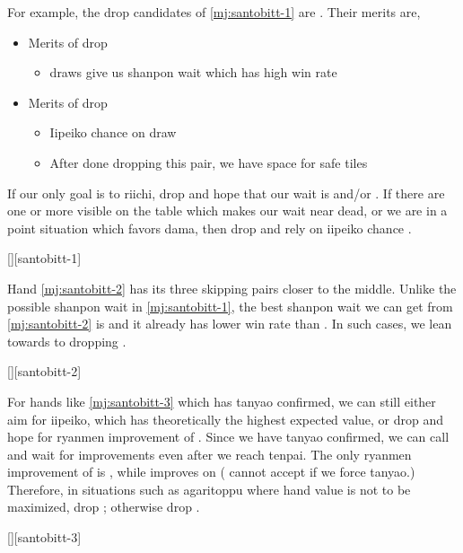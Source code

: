 \documentclass[12pt]{article}
\begin{document}
For example, the drop candidates of \ref{mj:santobitt-1} are . Their merits are,

\begin{itemize}
  \item Merits of  drop
  \begin{itemize}
    \item {} draws give us  shanpon wait which has high win rate
  \end{itemize}
  \item Merits of  drop
  \begin{itemize}
    \item Iipeiko chance on  draw
    \item After done dropping this pair, we have space for safe tiles
  \end{itemize}
\end{itemize}

If our only goal is to riichi, drop  and hope that our wait is  and/or . If there are one or more  visible on the table which makes our wait near dead, or we are in a point situation which favors dama, then drop  and rely on iipeiko chance \citep[][p.~35]{zero-teyaku}.

[][santobitt-1]

Hand \ref{mj:santobitt-2} has its three skipping pairs closer to the middle. Unlike the possible  shanpon wait in \ref{mj:santobitt-1}, the best shanpon wait we can get from \ref{mj:santobitt-2} is  and it already has lower win rate than . In such cases, we lean towards to dropping  \citep{yoteru-tobitoitsu}.

[][santobitt-2]

For hands like \ref{mj:santobitt-3} which has tanyao confirmed, we can still either aim for iipeiko, which has theoretically the highest expected value, or drop  and hope for ryanmen improvement of . Since we have tanyao confirmed, we can call and wait for improvements even after we reach tenpai. The only ryanmen improvement of  is , while  improves on  ( cannot accept  if we force tanyao.) Therefore, in situations such as agaritoppu where hand value is not to be maximized, drop ; otherwise drop  \citep[][p.~117]{uzaku-haikouritsu}.

[][santobitt-3]
\end{document}
